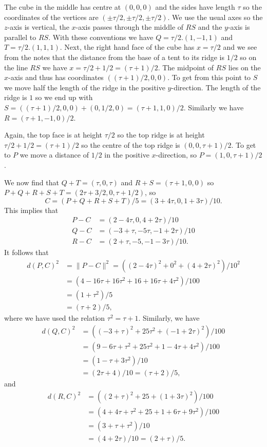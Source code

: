 \documentclass{amsart}
\renewcommand{\:}{\colon}
\theoremstyle{definition}
\newenvironment{solution}{{\noindent\bf Solution:}}{}
\begin{document}
\begin{solution}
 The cube in the middle has centre at $(0,0,0)$ and the sides have
 length $\tau$ so the coordinates of the vertices are
 $(\pm\tau/2,\pm\tau/2,\pm\tau/2)$.  We use the usual axes so the
 $z$-axis is vertical, the $x$-axis passes through the middle of $RS$
 and the $y$-axis is parallel to $RS$.  With these conventions we have
 $Q=\tau/2.(1,-1,1)$ and $T=\tau/2.(1,1,1)$.  Next, the right hand
 face of the cube has $x=\tau/2$ and we see from the notes that the
 distance from the base of a tent to its ridge is $1/2$ so on the line
 $RS$ we have $x=\tau/2+1/2=(\tau+1)/2$.  The midpoint of $RS$ lies on
 the $x$-axis and thus has coordinates $((\tau+1)/2,0,0)$.  To get
 from this point to $S$ we move half the length of the ridge in the
 positive $y$-direction.  The length of the ridge is $1$ so we end
 up with $S=((\tau+1)/2,0,0)+(0,1/2,0)=(\tau+1,1,0)/2$.  Similarly we
 have $R=(\tau+1,-1,0)/2$.  

 Again, the top face is at height $\tau/2$ so the top ridge is at
 height $\tau/2+1/2=(\tau+1)/2$ so the centre of the top ridge is
 $(0,0,\tau+1)/2$.  To get to $P$ we move a distance of $1/2$ in the
 positive $x$-direction, so $P=(1,0,\tau+1)/2$.  

 We now find that $Q+T=(\tau,0,\tau)$ and $R+S=(\tau+1,0,0)$ so
 $P+Q+R+S+T=(2\tau+3/2,0,\tau+1/2)$, so 
 \[ C = (P+Q+R+S+T)/5 = (3+4\tau,0,1+3\tau)/10. \]
 This implies that
 \begin{align*}
  P-C &= (2-4\tau,0,4+2\tau)/10 \\
  Q-C &= (-3+\tau,-5\tau,-1+2\tau)/10 \\
  R-C &= (2+\tau,-5,-1-3\tau)/10.
 \end{align*}
 It follows that 
 \begin{align*}
  d(P,C)^2 &= \|P-C\|^2 = ((2-4\tau)^2+0^2+(4+2\tau)^2)/10^2 \\
   &= (4-16\tau+16\tau^2+16+16\tau+4\tau^2)/100 \\
   &= (1+\tau^2)/5 \\
   &= (\tau+2)/5,
 \end{align*}
 where we have used the relation $\tau^2=\tau+1$.  Similarly, we have
 \begin{align*}
  d(Q,C)^2 &= ((-3+\tau)^2 + 25\tau^2 +(-1+2\tau)^2)/100 \\
   &= (9-6\tau+\tau^2+25\tau^2+1-4\tau+4\tau^2)/100 \\
   &= (1-\tau+3\tau^2)/10 \\
   &= (2\tau+4)/10 = (\tau+2)/5,
 \end{align*}
 and
 \begin{align*}
  d(R,C)^2 &= ((2+\tau)^2+25+(1+3\tau)^2)/100 \\
   &= (4+4\tau+\tau^2+25+1+6\tau+9\tau^2)/100 \\
   &= (3+\tau+\tau^2)/10 \\
   &= (4+2\tau)/10 = (2+\tau)/5.
 \end{align*}
\end{solution}
\end{document}
